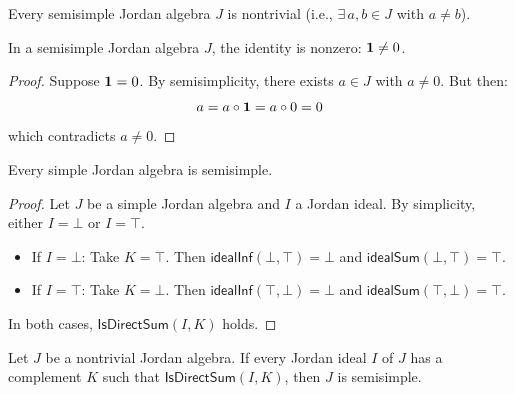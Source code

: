 \begin{proposition}
Every semisimple Jordan algebra $J$ is nontrivial (i.e., $\exists\, a, b \in J$ with $a \ne b$).
\end{proposition}

\begin{theorem}
In a semisimple Jordan algebra $J$, the identity is nonzero: $\mathbf{1} \ne 0$.
\end{theorem}
\begin{proof}
Suppose $\mathbf{1} = 0$. By semisimplicity, there exists $a \in J$ with $a \ne 0$. But then:
\[ a = a \circ \mathbf{1} = a \circ 0 = 0 \]
which contradicts $a \ne 0$.
\end{proof}

\begin{theorem}
Every simple Jordan algebra is semisimple.
\end{theorem}
\begin{proof}
Let $J$ be a simple Jordan algebra and $I$ a Jordan ideal. By simplicity, either $I = \bot$ or $I = \top$.
\begin{itemize}
  \item If $I = \bot$: Take $K = \top$. Then $\mathsf{idealInf}(\bot, \top) = \bot$ and $\mathsf{idealSum}(\bot, \top) = \top$.
  \item If $I = \top$: Take $K = \bot$. Then $\mathsf{idealInf}(\top, \bot) = \bot$ and $\mathsf{idealSum}(\top, \bot) = \top$.
\end{itemize}
In both cases, $\mathsf{IsDirectSum}(I, K)$ holds.
\end{proof}

\begin{theorem}[IsSemisimpleJordan.mk']
Let $J$ be a nontrivial Jordan algebra. If every Jordan ideal $I$ of $J$ has a complement $K$ such that $\mathsf{IsDirectSum}(I, K)$, then $J$ is semisimple.
\end{theorem}
